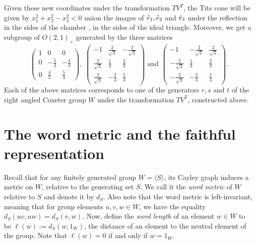 Given these new coordinates under the transformation \(TV^T\), the Tits cone will be given by \(x_1^2 + x_2^2 - x_3^2 < 0\) union the images of \(\Tilde{e}_1, \Tilde{e}_2\) and \(\Tilde{e}_3\) under the reflection in the sides of the chamber \ie, in the sides of the ideal triangle. %
Moreover, we get a subgroup of \(O(2,1)_+\) generated by the three matrices
\begin{equation*}
    \begin{pmatrix} 1 & 0 & 0 \\ 0 & -\frac{5}{3} & -\frac{4}{3} \\ 0 & \frac{4}{3} & \frac{5}{3} \end{pmatrix},\;
    \begin{pmatrix} -1 & \frac{2}{\sqrt{3}} & -\frac{2}{\sqrt{3}} \\ \frac{2}{\sqrt{3}} & \frac{1}{3} & \frac{2}{3} \\ \frac{2}{\sqrt{3}} & -\frac{2}{3} & \frac{5}{3} \end{pmatrix}
    \text{ and }
    \begin{pmatrix} -1 & -\frac{2}{\sqrt{3}} & \frac{2}{\sqrt{3}} \\ -\frac{2}{\sqrt{3}} & \frac{1}{3} & \frac{2}{3} \\ -\frac{2}{\sqrt{3}} & -\frac{2}{3} & \frac{5}{3} \end{pmatrix}.
\end{equation*}
Each of the above matrices corresponds to one of the generators \(r, s\) and \(t\) of the right angled Coxeter group \(W\) under the transformation \(TV^T\), constructed above.


\section{The word metric and the faithful representation}

Recall that for any finitely generated group \(W = \langle S \rangle\), its Cayley graph induces a metric on \(W\), relative to the generating set \(S\).
We call it the \emph{word metric} of \(W\) relative to \(S\) and denote it by \(d_S\).
Also note that the word metric is left-invariant, meaning that for group elements \(u,v,w\in W\), we have the equality \(d_S(uv,uw) = d_S(v,w)\).
Now, define the \emph{word length} of an element \(w\in W\) to be \(\ell(w) := d_S(w, 1_W)\), the distance of an element to the neutral element of the group.
Note that \(\ell(w) = 0\) if and only if \(w = 1_W\).

